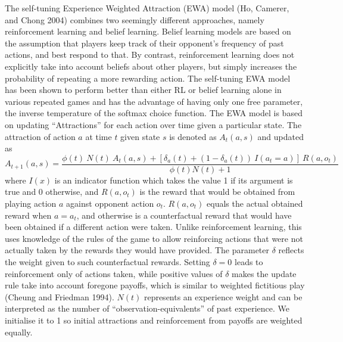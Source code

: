 \documentclass[smallextended]{svjour3}       %
\begin{document}
The self-tuning Experience Weighted Attraction (EWA) model (Ho, Camerer,
and Chong 2004) combines two seemingly different approaches, namely
reinforcement learning and belief learning. Belief learning models are
based on the assumption that players keep track of their opponent's
frequency of past actions, and best respond to that. By contrast,
reinforcement learning does not explicitly take into account beliefs
about other players, but simply increases the probability of repeating a
more rewarding action. The self-tuning EWA model has been shown to
perform better than either RL or belief learning alone in various
repeated games and has the advantage of having only one free parameter,
the inverse temperature of the softmax choice function. The EWA model is
based on updating ``Attractions'' for each action over time given a
particular state. The attraction of action \(a\) at time \(t\) given
state \(s\) is denoted as \(A_{t}(a, s)\) and updated as
\[ A_{t+1}(a,s) =  \frac{\phi(t) \ N(t) \ A_{t}(a,s) + [ \delta_{a}(t) + (1-\delta_{a}(t)) \ I(a_t = a )] \ R(a,o_t) } {\phi(t)N(t) + 1} \]
where \(I(x)\) is an indicator function which takes the value 1 if its
argument is true and 0 otherwise, and \(R(a,o_t)\) is the reward that
would be obtained from playing action \(a\) against opponent action
\(o_t\). \(R(a,o_t)\) equals the actual obtained reward when
\(a = a_t\), and otherwise is a counterfactual reward that would have
been obtained if a different action were taken. Unlike reinforcement
learning, this uses knowledge of the rules of the game to allow
reinforcing actions that were not actually taken by the rewards they
would have provided. The parameter \(\delta\) reflects the weight given
to such counterfactual rewards. Setting \(\delta = 0\) leads to
reinforcement only of actions taken, while positive values of \(\delta\)
makes the update rule take into account foregone payoffs, which is
similar to weighted fictitious play (Cheung and Friedman 1994). \(N(t)\)
represents an experience weight and can be interpreted as the number of
``observation-equivalents'' of past experience. We initialise it to 1 so
initial attractions and reinforcement from payoffs are weighted equally.
\end{document}
